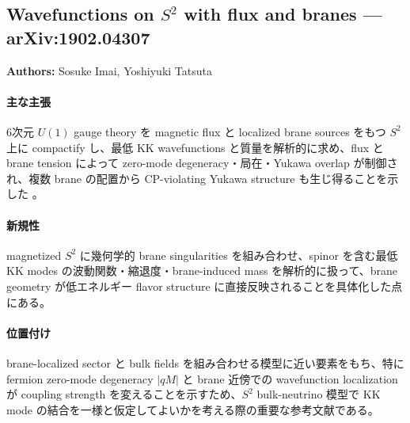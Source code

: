 \subsection{Wavefunctions on $S^2$ with flux and branes --- arXiv:1902.04307}

\textbf{Authors:} Sosuke Imai, Yoshiyuki Tatsuta

\paragraph{主な主張}
6次元 $U(1)$ gauge theory を magnetic flux と localized brane sources をもつ $S^2$ 上に compactify し、最低 KK wavefunctions と質量を解析的に求め、flux と brane tension によって zero-mode degeneracy・局在・Yukawa overlap が制御され、複数 brane の配置から CP-violating Yukawa structure も生じ得ることを示した \cite{Imai:2019S2FluxBranes}。

\paragraph{新規性}
magnetized $S^2$ に幾何学的 brane singularities を組み合わせ、spinor を含む最低 KK modes の波動関数・縮退度・brane-induced mass を解析的に扱って、brane geometry が低エネルギー flavor structure に直接反映されることを具体化した点にある。

\paragraph{位置付け}
brane-localized sector と bulk fields を組み合わせる模型に近い要素をもち、特に fermion zero-mode degeneracy $|qM|$ と brane 近傍での wavefunction localization が coupling strength を変えることを示すため、$S^2$ bulk-neutrino 模型で KK mode の結合を一様と仮定してよいかを考える際の重要な参考文献である。